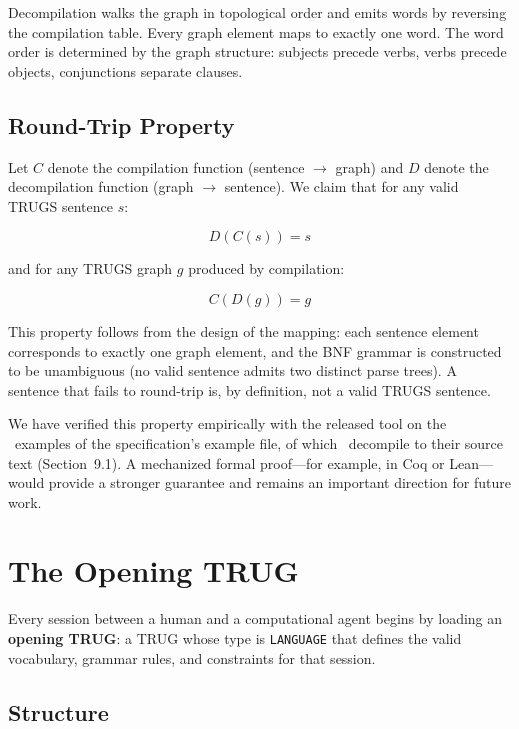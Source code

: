 \documentclass{article}
\begin{document}
Decompilation walks the graph in topological order and emits words by reversing the compilation table. Every graph element maps to exactly one word. The word order is determined by the graph structure: subjects precede verbs, verbs precede objects, conjunctions separate clauses.

\subsection{Round-Trip Property}

Let $C$ denote the compilation function (sentence $\to$ graph) and $D$ denote the decompilation function (graph $\to$ sentence). We claim that for any valid TRUGS sentence $s$:

$$D(C(s)) = s$$

\noindent and for any TRUGS graph $g$ produced by compilation:

$$C(D(g)) = g$$

This property follows from the design of the mapping: each sentence element corresponds to exactly one graph element, and the BNF grammar is constructed to be unambiguous (no valid sentence admits two distinct parse trees). A sentence that fails to round-trip is, by definition, not a valid TRUGS sentence.

We have verified this property empirically with the released tool on the \ExamplesTotal\ examples of the specification's example file, of which \ExamplesRoundTrip\ decompile to their source text (Section~9.1). A mechanized formal proof---for example, in Coq or Lean---would provide a stronger guarantee and remains an important direction for future work.

\section{The Opening TRUG}

Every session between a human and a computational agent begins by loading an \textbf{opening TRUG}: a TRUG whose type is \texttt{LANGUAGE} that defines the valid vocabulary, grammar rules, and constraints for that session.

\subsection{Structure}
\end{document}
